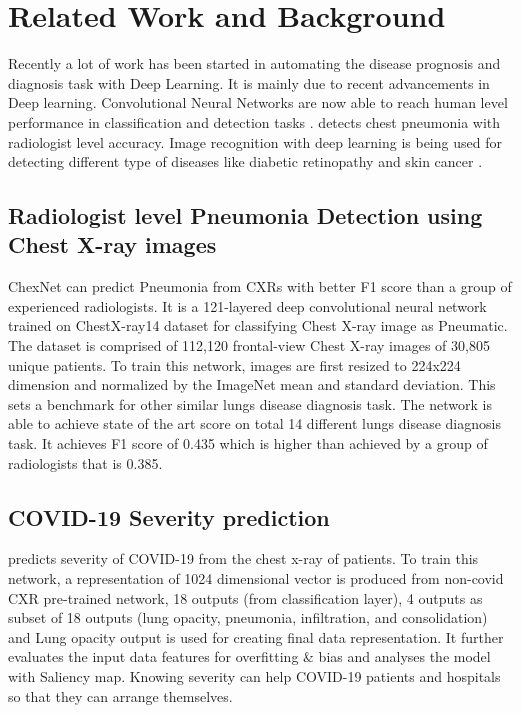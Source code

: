 \documentclass[a4paper]{article}
\begin{document}
\section{Related Work and Background}

Recently a lot of work has been started in automating the disease prognosis and diagnosis task with Deep Learning. It is mainly due to recent advancements in Deep learning. Convolutional Neural Networks \cite{lenet} are now able to reach human level performance in classification and detection tasks \cite{humanlevelcnn}. \cite{rajpurkar2017chexnet} \cite{chexpert} \cite{lu2020multiobjective} detects chest pneumonia with radiologist level accuracy. Image recognition with deep learning is being used for detecting different type of diseases like diabetic retinopathy and skin cancer \cite{retinopathy}.


\subsection{Radiologist level Pneumonia Detection using Chest X-ray images}

ChexNet \cite{rajpurkar2017chexnet} can predict Pneumonia from CXRs with better F1 score than a group of experienced radiologists. It is a 121-layered deep convolutional neural network trained on ChestX-ray14 dataset \cite{Wang_2017} for classifying Chest X-ray image as Pneumatic. The dataset is comprised of 112,120 frontal-view Chest X-ray images of 30,805 unique patients. To train this network, images are first resized to 224x224 dimension and normalized by the ImageNet \cite{russakovsky2015imagenet} mean and standard deviation.
This sets a benchmark for other similar lungs disease diagnosis task. The network is able to achieve state of the art score on total 14 different lungs disease diagnosis task. It achieves F1 score of 0.435 which is higher than achieved by a group of radiologists that is 0.385.


\subsection{COVID-19 Severity prediction}

\cite{cohen2020predicting} predicts severity of COVID-19 from the chest x-ray of patients. To train this network, a representation of 1024 dimensional vector is produced from non-covid CXR pre-trained network, 18 outputs (from classification layer), 4 outputs as subset of 18 outputs (lung opacity, pneumonia, infiltration, and consolidation) and Lung opacity output is used for creating final data representation. It further evaluates the input data features for overfitting \& bias and analyses the model with Saliency map. Knowing severity can help COVID-19 patients and hospitals so that they can arrange themselves.
\end{document}
